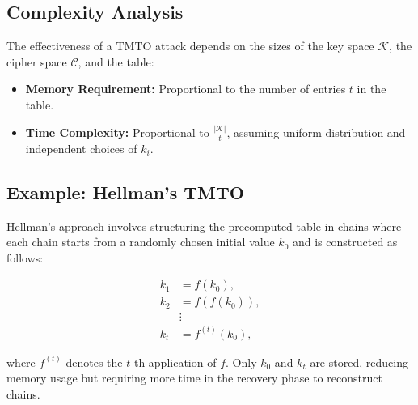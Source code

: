 \subsection*{Complexity Analysis}
The effectiveness of a TMTO attack depends on the sizes of the key space $\mathcal{K}$, the cipher space $\mathcal{C}$, and the table:

\begin{itemize}
	\item \textbf{Memory Requirement:} Proportional to the number of entries $t$ in the table.
	\item \textbf{Time Complexity:} Proportional to $\frac{|\mathcal{K}|}{t}$, assuming uniform distribution and independent choices of $k_i$.
\end{itemize}

\subsection*{Example: Hellman's TMTO}
Hellman's approach involves structuring the precomputed table in chains where each chain starts from a randomly chosen initial value $k_0$ and is constructed as follows:

\begin{align*}
	k_1 &= f(k_0), \\
	k_2 &= f(f(k_0)), \\
	&\vdots \\
	k_t &= f^{(t)}(k_0),
\end{align*}

where $f^{(t)}$ denotes the $t$-th application of $f$. Only $k_0$ and $k_t$ are stored, reducing memory usage but requiring more time in the recovery phase to reconstruct chains.
